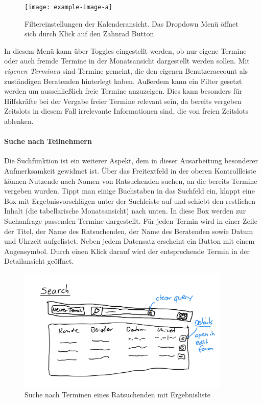 \documentclass[12pt]{article}
\begin{document}
\begin{figure}[h]
    \caption{Filtereinstellungen der Kalenderansicht. Das Dropdown Menü öffnet sich durch Klick auf den Zahnrad Button}
    \centering
    \texttt{[image: example-image-a]}
\end{figure}

In diesem Menü kann über Toggles eingestellt werden, ob nur eigene Termine oder
auch fremde Termine in der Monatsansicht dargestellt werden sollen. Mit
\textit{eigenen Terminen} sind Termine gemeint, die den eigenen Benutzeraccount
als zuständigen Beratenden hinterlegt haben. Außerdem kann ein Filter gesetzt
werden um ausschließlich freie Termine anzuzeigen. Dies kann besonders für
Hilfskräfte bei der Vergabe freier Termine relevant sein, da bereits vergeben
Zeitslots in diesem Fall irrelevante Informationen sind, die von freien
Zeitslots ablenken.

\paragraph{Suche nach Teilnehmern}

Die Suchfunktion ist ein weiterer Aspekt, dem in dieser Ausarbeitung besonderer
Aufmerksamkeit gewidmet ist. Über das Freitextfeld in der oberen Kontrollleiste
können Nutzende nach Namen von Ratsuchenden suchen, an die bereits Termine
vergeben wurden. Tippt man einige Buchstaben in das Suchfeld ein, klappt eine
Box mit Ergebnisvorschlägen unter der Suchleiste auf und schiebt den restlichen
Inhalt (die tabellarische Monatsansicht) nach unten. In diese Box werden zur
Suchanfrage passenden Termine dargestellt. Für jeden Termin wird in einer Zeile
der Titel, der Name des Ratsuchenden, der Name des Beratenden sowie Datum und
Uhrzeit aufgelistet. Neben jedem Datensatz erscheint ein Button mit einem
Augensymbol. Durch einen Klick darauf wird der entsprechende Termin in der
Detailansicht geöffnet.

\begin{figure}[h]
    \caption{Suche nach Terminen eines Ratsuchenden mit Ergebnisliste}
    \centering
    \includegraphics[width=0.9\textwidth]{doodle_search_view.jpeg}
\end{figure}
\end{document}
